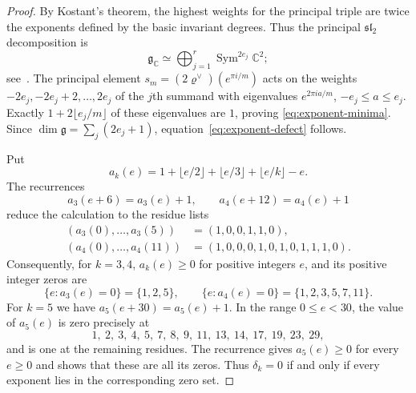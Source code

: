 \documentclass[11pt,a4paper,reqno]{amsart}
\theoremstyle{plain}
\theoremstyle{definition}
\theoremstyle{remark}
\numberwithin{equation}{section}
\DeclareMathOperator{\Sym}{Sym}
\newcommand{\CC}{\mathbb C}
\newcommand{\fg}{\mathfrak g}
\newcommand{\rh}{\varrho^\vee}
\begin{document}
\begin{proof}
By Kostant's theorem, the highest weights for the principal triple are twice the exponents defined by the basic invariant degrees. Thus the principal $\mathfrak{sl}_2$ decomposition is
\[
\fg_{\CC}\simeq
\bigoplus_{j=1}^r\Sym^{2e_j}\CC^2;
\]
see~\cite[\S32.3]{EtingofExponents}. The principal element
$s_m=(2\rh)(e^{\pi i/m})$ acts on the weights
$-2e_j,-2e_j+2,\ldots,2e_j$ of the $j$th summand with eigenvalues
$e^{2\pi i a/m}$, $-e_j\le a\le e_j$. Exactly
$1+2\lfloor e_j/m\rfloor$ of these eigenvalues are $1$, proving \eqref{eq:exponent-minima}. Since
$\dim\fg=\sum_j(2e_j+1)$, equation~\eqref{eq:exponent-defect} follows.

Put
\[
a_k(e)=1+\lfloor e/2\rfloor+\lfloor e/3\rfloor+\lfloor e/k\rfloor-e.
\]
The recurrences
\[
a_3(e+6)=a_3(e)+1,\qquad
a_4(e+12)=a_4(e)+1
\]
reduce the calculation to the residue lists
\[
\begin{split}
(a_3(0),\ldots,a_3(5))&=(1,0,0,1,1,0),\\
(a_4(0),\ldots,a_4(11))&=(1,0,0,0,1,0,1,0,1,1,1,0).
\end{split}
\]
Consequently, for $k=3,4$, $a_k(e)\ge0$ for positive integers $e$, and its positive
integer zeros are
\[
\{e:a_3(e)=0\}=\{1,2,5\},\qquad
\{e:a_4(e)=0\}=\{1,2,3,5,7,11\}.
\]
For $k=5$ we have $a_5(e+30)=a_5(e)+1$. In the range $0\le e<30$, the value of $a_5(e)$ is zero precisely at
\[
1,\ 2,\ 3,\ 4,\ 5,\ 7,\ 8,\ 9,\ 11,\ 13,\ 14,\ 17,\ 19,\ 23,\ 29,
\]
and is one at the remaining residues. The recurrence gives $a_5(e)\ge0$ for every $e\ge0$ and shows that these are all its zeros.
Thus $\delta_k=0$ if and only if every exponent lies in the corresponding
zero set.


\end{proof}
\end{document}

